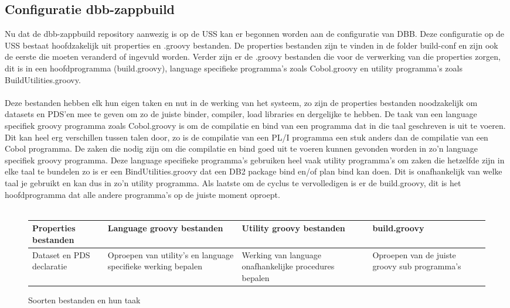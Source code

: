 \subsection{Configuratie dbb-zappbuild}
Nu dat de dbb-zappbuild repository aanwezig is op de USS kan er begonnen worden aan de configuratie van DBB. Deze configuratie op de USS bestaat hoofdzakelijk uit properties en .groovy bestanden. De properties bestanden zijn te vinden in de folder build-conf en zijn ook de eerste die moeten veranderd of ingevuld worden. Verder zijn er de .groovy bestanden die voor de verwerking van die properties zorgen, dit is in een hoofdprogramma (build.groovy), language specifieke programma's zoals Cobol.groovy en utility programma's zoals BuildUtilities.groovy.
\\ \\
Deze bestanden hebben elk hun eigen taken en nut in de werking van het systeem, zo zijn de properties bestanden noodzakelijk om datasets en PDS'en mee te geven om zo de juiste binder, compiler, load libraries en dergelijke te hebben. De taak van een language specifiek groovy programma zoals Cobol.groovy is om de compilatie en bind van een programma dat in die taal geschreven is uit te voeren. Dit kan heel erg verschillen tussen talen door, zo is de compilatie van een PL/I programma een stuk anders dan de compilatie van een Cobol programma. De zaken die nodig zijn om die compilatie en bind goed uit te voeren kunnen gevonden worden in zo'n language specifiek groovy programma. Deze language specifieke programma's gebruiken heel vaak utility programma's om zaken die hetzelfde zijn in elke taal te bundelen zo is er een BindUtilities.groovy dat een DB2 package bind en/of plan bind kan doen. Dit is onafhankelijk van welke taal je gebruikt en kan dus in zo'n utility programma. Als laatste om de cyclus te vervolledigen is er de build.groovy, dit is het hoofdprogramma dat alle andere programma's op de juiste moment oproept.
\\ \\
\begin{figure}[h]
\begin{tabularx}{1\textwidth} { 
        | >{\centering\arraybackslash}X 
        | >{\centering\arraybackslash}X 
        | >{\centering\arraybackslash}X 
        | >{\centering\arraybackslash}X  | }
    \hline
    Properties bestanden & 
    Language groovy bestanden & 
    Utility groovy bestanden & 
    build.groovy \\
    \hline
    Dataset en PDS declaratie & 
    Oproepen van utility's en language specifieke werking bepalen & 
    Werking van language onafhankelijke procedures bepalen & 
    Oproepen van de juiste groovy sub programma's \\ 
    \hline
\end{tabularx}
\caption{Soorten bestanden en hun taak}
\label{tab:soorten bestanden}
\end{figure}

